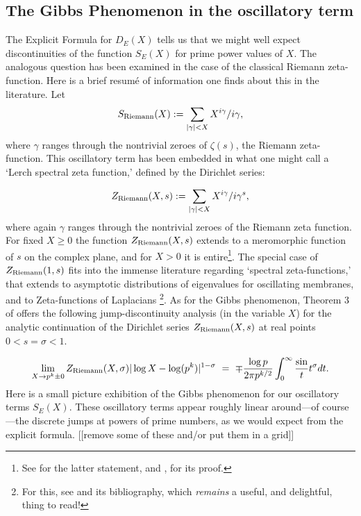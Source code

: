 \documentclass[11pt]{article}
\theoremstyle{plain}
\theoremstyle{definition}
\newtheorem{project}[theorem]{Project}
\numberwithin{equation}{section}
\numberwithin{figure}{section}
\numberwithin{table}{section}
\begin{document}
 \subsection{ The Gibbs Phenomenon in the oscillatory term} The Explicit Formula for $D_E(X)$ tells us that we might well expect discontinuities of the function $S_E(X)$ for prime power values of $X$. The analogous question has been  examined in the case of the classical Riemann zeta-function.  Here is a brief resum{\'e} of information one finds about this in the literature. Let $$S_{\rm Riemann}(X): = \sum_{|\gamma|<X}X^{i\gamma}/i\gamma,$$ where $\gamma$ ranges through the nontrivial zeroes of $\zeta(s)$, the Riemann zeta-function. This oscillatory term has been  embedded in what one might call a `Lerch spectral zeta function,' defined by the Dirichlet series:

 $$Z_{\rm Riemann}(X,s): =   \sum_{|\gamma|<X}X^{i\gamma}/i\gamma^s,$$ where again $\gamma$ ranges through the nontrivial zeroes of the Riemann zeta function.  For fixed $X\ge 0$ the function $Z_{\rm Riemann}(X,s)$ extends to a meromorphic function of $s$ on the  complex plane, and for $X>0$ it is entire{\footnote{ See \cite{Fu3} for the latter statement, and \cite{Fu1}, \cite{Fu2} for its proof.\vskip10pt}}.  The special case of $Z_{\rm Riemann}(1,s)$  fits into the immense literature regarding `spectral zeta-functions,' that extends to asymptotic
distributions of eigenvalues for oscillating membranes, and  to Zeta-functions of Laplacians {\footnote{ For this, see \cite{W} and its bibliography, which {\it remains} a useful, and delightful,   thing to read!}}. As for the Gibbs phenomenon, Theorem 3 of \cite{Fu3} offers the following jump-discontinuity analysis (in the variable $X$) for the analytic continuation of the Dirichlet series $Z_{\rm Riemann}(X,s)$ at real points $0 < s = \sigma < 1$.

 $$\lim_{X \to p^k\pm 0}{{Z_{\rm Riemann}(X,\sigma)}{|\log X -\log(p^k)|^{1-\sigma}} \ = \ \mp {\frac{\log p}{2\pi p^{k/2}}}\int_0^{\infty}{\frac \sin t}{t^{\sigma}}}dt.$$
 \vskip10pt
  \vskip10pt
  Here is a small picture exhibition of the Gibbs phenomenon for our oscillatory terms $S_E(X)$.  These oscillatory terms appear roughly linear around---of course---the discrete jumps at powers of prime numbers, as we would expect from
  the explicit formula. [[remove some of these and/or put them in a grid]]
 \vskip10pt
\end{document}
